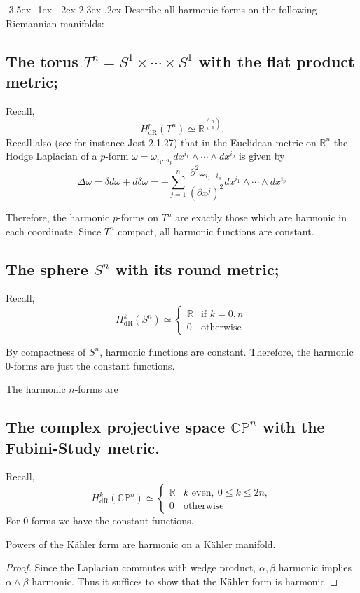 \documentclass[10pt]{article}
\makeatletter
\renewcommand\section{\@startsection{section}{1}{\z@}%
                                  {-3.5ex \@plus -1ex \@minus -.2ex}%
                                  {2.3ex \@plus.2ex}%
                                  {\normalfont\large\bfseries}}
\newcommand{\CP}{\ensuremath{\mathbb{CP}}}
\newcommand{\R}{\ensuremath{\mathbb{R}}}
\newcommand{\del}{\ensuremath{\partial}}
\DeclareMathOperator{\2}{II}
\makeatother
\begin{document}
\section{Describe all harmonic forms on the following Riemannian manifolds:}
\subsection{The torus $T^n = S^1 \times \cdots \times S^1$ with the flat product metric;}
Recall,
\[H_{\mathrm{dR}}^{p}(T^n) \simeq \R^{n \choose p}.\]
Recall also (see for instance Jost 2.1.27) that in the Euclidean metric on $\R^n$ the Hodge Laplacian of a $p$-form $\omega = \omega_{i_1 \cdots i_p} dx^{i_1} \wedge \cdots \wedge dx^{i_p} $ is given by  
\[\Delta \omega = \delta d \omega + d \delta \omega = - \sum_{j=1}^n \frac{\del^2 \omega_{i_1 \cdots i_p}}{( \del x^j )^2} dx^{i_1} \wedge \cdots \wedge dx^{i_p}\]

Therefore, the harmonic $p$-forms on $T^n$ are exactly those which are harmonic in each coordinate. Since $T^n$  compact, all harmonic functions are constant. 


\subsection{The sphere $S^n$ with its round metric;}
Recall,
\[H_{\mathrm{dR}}^{k}(S^n) \simeq \begin{cases} \R & \mbox{if } k = 0, n \\ 0 & \mbox{otherwise } \end{cases}\]

By compactness of $S^n$, harmonic functions are constant. Therefore, the harmonic 0-forms are just the constant functions. 

The harmonic $n$-forms are 

\subsection{\label{f-study}The complex projective space $\CP^n$ with the Fubini-Study metric.}
Recall,
\[H_{\mathrm{dR}}^k(\CP^n) \simeq \begin{cases} \R & k \mbox{ even},\ 0 \leq k \leq 2 n, \\ 0 & \mbox{otherwise} \end{cases}\]
For 0-forms we have the constant functions. 

Powers of the K\"{a}hler form are harmonic on a K\"{a}hler manifold.
\begin{proof}
Since the Laplacian commutes with wedge product, $\alpha, \beta$ harmonic implies $\alpha \wedge \beta$ harmonic. Thus it suffices to show that the K\"{a}hler form  is harmonic

\end{proof}
\end{document}
